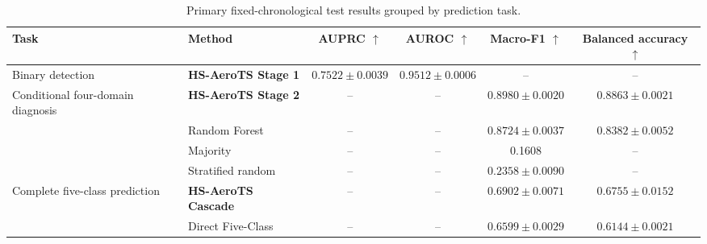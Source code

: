 \begin{table}[H]
\caption{Primary fixed-chronological test results grouped by prediction task.}
\label{tab:main_results}
\centering
\footnotesize
\renewcommand{\arraystretch}{1.12}
\setlength{\tabcolsep}{2.5pt}
\begin{tabularx}{\textwidth}{@{}>{\RaggedRight\arraybackslash}p{3.05cm} >{\RaggedRight\arraybackslash}X c c c c@{}}
\toprule
\textbf{Task} & \textbf{Method} & \textbf{AUPRC $\uparrow$} & \textbf{AUROC $\uparrow$} & \shortstack{\textbf{Macro-F1}\\$\uparrow$} & \shortstack{\textbf{Balanced}\\\textbf{accuracy $\uparrow$}}\\
\midrule
Binary detection & \textbf{HS-AeroTS Stage 1} & $0.7522\pm0.0039$ & $0.9512\pm0.0006$ & -- & --\\
\addlinespace[2pt]
Conditional four-domain diagnosis & \textbf{HS-AeroTS Stage 2} & -- & -- & $0.8980\pm0.0020$ & $0.8863\pm0.0021$\\
 & Random Forest & -- & -- & $0.8724\pm0.0037$ & $0.8382\pm0.0052$\\
 & Majority & -- & -- & 0.1608 & --\\
 & Stratified random & -- & -- & $0.2358\pm0.0090$ & --\\
\addlinespace[2pt]
Complete five-class prediction & \textbf{HS-AeroTS Cascade} & -- & -- & $0.6902\pm0.0071$ & $0.6755\pm0.0152$\\
 & Direct Five-Class & -- & -- & $0.6599\pm0.0029$ & $0.6144\pm0.0021$\\

\bottomrule
\end{tabularx}
\par\vspace{2pt}{\scriptsize Values are mean $\pm$ model-seed standard deviation over five seeds unless noted; ``--'' denotes a metric that is not applicable or was not reported. Budget-limited normal-only references are reported separately in Supplementary Material Section S6.}
\end{table}